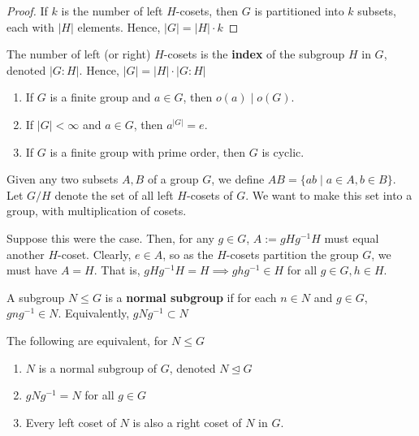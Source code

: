 \begin{proof}
    If $k$ is the number of left $H$-cosets, then $G$ is partitioned into $k$ subsets, each with $|H|$ elements. Hence, $|G| = |H|\cdot k$
\end{proof}

\begin{defn}
    The number of left (or right) $H$-cosets is the \textbf{index} of the subgroup $H$ in $G$, denoted $|G:H|$. Hence, $|G| = |H| \cdot |G:H|$
\end{defn}

\begin{cor}
    \begin{enumerate}
        \item[(a)] If $G$ is a finite group and $a \in G$, then $o(a) \mid o(G)$.
        \item[(b)] If $|G|<\infty$ and $a \in G$, then $a^{|G|}=e$.
        \item[(c)] If $G$ is a finite group with prime order, then $G$ is cyclic.
    \end{enumerate}
\end{cor}

\begin{defn}
    Given any two subsets $A,B$ of a group $G$, we define $AB=\{ab \mid a\in A,b \in B\}$. Let $G/H$ denote the set of all left $H$-cosets of $G$. We want to make this set into a group, with multiplication of cosets.
\end{defn}

Suppose this were the case. Then, for any $g \in G$, $A:=gHg^{-1}H$ must equal another $H$-coset. Clearly, $e \in A$, so as the $H$-cosets partition the group $G$, we must have $A = H$. That is, $gHg^{-1}H=H\implies ghg^{-1}\in H$ for all $g\in G,h \in H$.

\begin{defn}
    A subgroup $N \leq G$ is a \textbf{normal subgroup} if for each $n \in N$ and $g \in G$, $gng^{-1}\in N$. Equivalently, $gNg^{-1}\subset N$
\end{defn}

\begin{prop}
    The following are equivalent, for $N \leq G$
    \begin{enumerate}
        \item $N$ is a normal subgroup of $G$, denoted $N \unlhd G$
        \item $gNg^{-1}=N$ for all $g \in G$
        \item Every left coset of $N$ is also a right coset of $N$ in $G$.
    \end{enumerate}
\end{prop}

